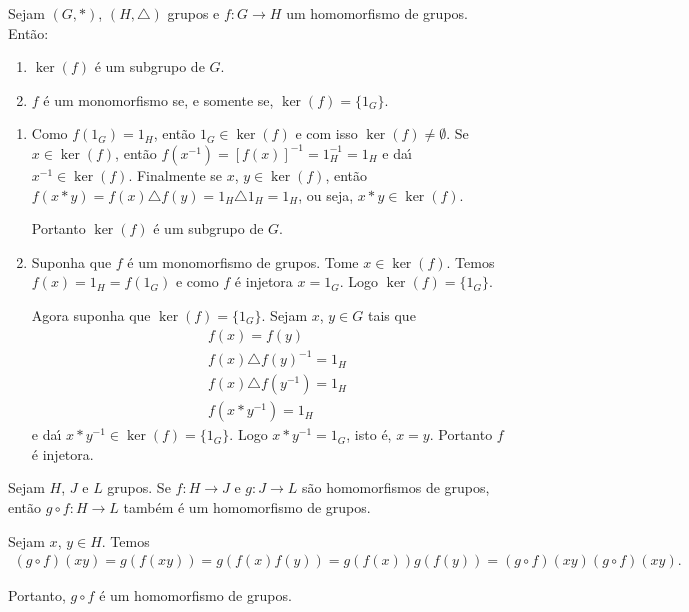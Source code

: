 \begin{proposicao}
    Sejam $(G, *)$, $(H, \triangle)$ grupos e $f : G \to H$ um homomorfismo de grupos. Ent\~ao:
    \begin{enumerate}[label={\roman*})]
        \item $\ker(f)$ \'e um subgrupo de $G$.
        \item $f$ \'e um monomorfismo se, e somente se, $\ker(f) = \{1_G\}$.
    \end{enumerate}
\end{proposicao}
\begin{prova}
    \begin{enumerate}[label={\roman*})]
        \item Como $f(1_G) = 1_H$, ent\~ao $1_G \in \ker(f)$ e com isso $\ker(f) \ne \emptyset$. Se $x \in \ker(f)$, ent\~ao $f(x^{-1}) = [f(x)]^{-1} = 1_H^{-1} = 1_H$ e da{\'\i} $x^{-1} \in \ker(f)$. Finalmente se $x$, $y \in \ker(f)$, ent\~ao $f(x*y) = f(x)\triangle f(y) = 1_H \triangle 1_H = 1_H$, ou seja, $x * y \in \ker(f)$.

        Portanto $\ker(f)$ \'e um subgrupo de $G$.

        \item Suponha que $f$ \'e um monomorfismo de grupos. Tome $x \in \ker(f)$. Temos $f(x) = 1_H = f(1_G)$ e como $f$ \'e injetora $x = 1_G$. Logo $\ker(f) = \{1_G\}$.

        Agora suponha que $\ker(f) = \{1_G\}$. Sejam $x$, $y \in G$ tais que
        \begin{align*}
            &f(x) = f(y)\\
            &f(x)\triangle f(y)^{-1} = 1_H\\
            &f(x)\triangle f(y^{-1}) = 1_H\\
            &f(x * y^{-1}) = 1_H
        \end{align*}
        e da{\'\i} $x*y^{-1} \in \ker(f) = \{1_G\}$. Logo $x*y^{-1} = 1_G$, isto \'e, $x = y$. Portanto $f$ \'e injetora.
    \end{enumerate}
\end{prova}

\begin{proposicao}
    Sejam $H$, $J$ e $L$ grupos. Se $f : H \to J$ e $g : J \to L$ s\~ao homomorfismos de grupos, ent\~ao $g \circ f : H \to L$ tamb\'em \'e um homomorfismo de grupos.
\end{proposicao}
\begin{prova}
    Sejam $x$, $y \in H$. Temos
    \begin{align*}
        (g \circ f)(xy) = g(f(xy)) = g(f(x)f(y)) = g(f(x))g(f(y)) = (g \circ f)(xy)(g \circ f)(xy).
    \end{align*}

    Portanto, $g \circ f$ \'e um homomorfismo de grupos.
\end{prova}



